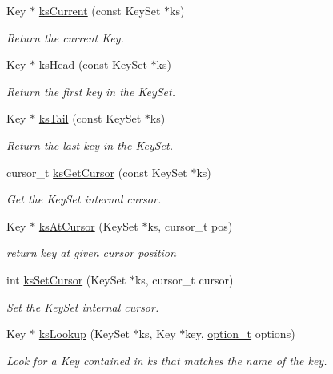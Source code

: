 \begin{DoxyCompactItemize}
Key $\ast$ \hyperlink{group__keyset_ga4287b9416912c5f2ab9c195cb74fb094}{ks\+Current} (const Key\+Set $\ast$ks)
\begin{DoxyCompactList}\small\item\em Return the current Key. \end{DoxyCompactList}\item 
Key $\ast$ \hyperlink{group__keyset_gae7dbf3aef70e67b5328475eb3d1f92f5}{ks\+Head} (const Key\+Set $\ast$ks)
\begin{DoxyCompactList}\small\item\em Return the first key in the Key\+Set. \end{DoxyCompactList}\item 
Key $\ast$ \hyperlink{group__keyset_gadca442c4ab43cf532b15091d7711559e}{ks\+Tail} (const Key\+Set $\ast$ks)
\begin{DoxyCompactList}\small\item\em Return the last key in the Key\+Set. \end{DoxyCompactList}\item 
cursor\+\_\+t \hyperlink{group__keyset_gaffe507ab9281c322eb16c3e992075d29}{ks\+Get\+Cursor} (const Key\+Set $\ast$ks)
\begin{DoxyCompactList}\small\item\em Get the Key\+Set internal cursor. \end{DoxyCompactList}\item 
Key $\ast$ \hyperlink{group__keyset_ga3604cc41505f7e19db945cece67190b6}{ks\+At\+Cursor} (Key\+Set $\ast$ks, cursor\+\_\+t pos)
\begin{DoxyCompactList}\small\item\em return key at given cursor position \end{DoxyCompactList}\item 
int \hyperlink{group__keyset_gad94c9ffaa3e8034564c0712fd407c345}{ks\+Set\+Cursor} (Key\+Set $\ast$ks, cursor\+\_\+t cursor)
\begin{DoxyCompactList}\small\item\em Set the Key\+Set internal cursor. \end{DoxyCompactList}\item 
Key $\ast$ \hyperlink{group__keyset_gaa34fc43a081e6b01e4120daa6c112004}{ks\+Lookup} (Key\+Set $\ast$ks, Key $\ast$key, \hyperlink{group__keyset_ga98a3d6a4016c9dad9cbd1a99a9c2a45a}{option\+\_\+t} options)
\begin{DoxyCompactList}\small\item\em Look for a Key contained in {\ttfamily ks} that matches the name of the {\ttfamily key}. \end{DoxyCompactList}\item 

\end{DoxyCompactItemize}
